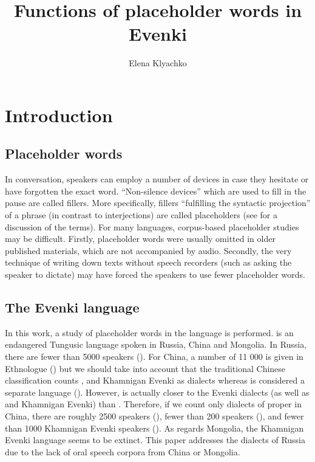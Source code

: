 \documentclass[output=paper,colorlinks,citecolor=brown]{langscibook}
\author{Elena Klyachko\affiliation{Higher School of Economics \& Institute of Linguistics, Russian Academy of Sciences}}
\title{Functions of placeholder words in Evenki}
\begin{document}
\maketitle

\section{Introduction}

\subsection{Placeholder words}


In conversation, speakers can employ a number of devices in case they hesitate or have forgotten the exact word. “Non-silence devices” which are used to fill in the pause are called fillers. More specifically, fillers “fulfilling the syntactic projection” of a phrase (in contrast to interjections) are called placeholders (see \citealt{Fox2010} for a discussion of the terms). For many languages, corpus-based placeholder studies may be difficult. Firstly, placeholder words were usually omitted in older published materials, which are not accompanied by audio. Secondly, the very technique of writing down texts without speech recorders (such as asking the speaker to dictate) may have forced the speakers to use fewer placeholder words.

\subsection{The Evenki language}

In this work, a study of placeholder words in the  language is performed.  is an endangered Tungusic language spoken in Russia, China and Mongolia. In Russia, there are fewer than 5000 speakers (\citealt{Census2010}). For China, a number of 11 000 is given in Ethnologue (\citeyear{Ethnologue2019}) but we should take into account that the traditional Chinese classification counts ,  and Khamnigan Evenki as  dialects whereas  is considered a separate language (\citealt{Tsumagari1992}). However,  is actually closer to the  Evenki dialects (as well as  and Khamnigan Evenki) than . Therefore, if we count only dialects of  proper in China, there are roughly 2500  speakers (\citealt{WhaleyLi2000}), fewer than 200  speakers (\citealt{Tsumagari1992}), and fewer than 1000 Khamnigan Evenki speakers (\citealt{Whaley1998}). As regards Mongolia, the Khamnigan Evenki language seems to be extinct. This paper addresses the  dialects of Russia due to the lack of oral speech corpora from China or Mongolia.
\end{document}
